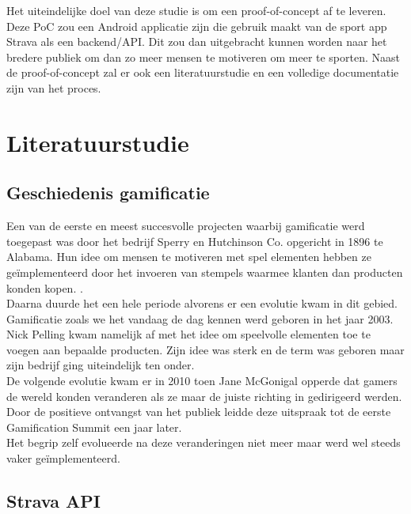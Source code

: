 Het uiteindelijke doel van deze studie is om een proof-of-concept af te leveren. Deze PoC zou een Android applicatie zijn die gebruik maakt van de sport app Strava als een backend/API. Dit zou dan uitgebracht kunnen worden naar het bredere publiek om dan zo meer mensen te motiveren om meer te sporten. Naast de proof-of-concept zal er ook een literatuurstudie en een volledige documentatie zijn van het proces.


\section{Literatuurstudie}%
\label{sec:state-of-the-art}

\subsection{Geschiedenis gamificatie}

Een van de eerste en meest succesvolle projecten waarbij gamificatie werd toegepast was door het bedrijf Sperry en Hutchinson Co. opgericht in 1896 te Alabama. Hun idee om mensen te motiveren met spel elementen hebben ze geïmplementeerd door het invoeren van stempels waarmee klanten dan producten konden kopen. \autocite{Christians2018}. \\

Daarna duurde het een hele periode alvorens er een evolutie kwam in dit gebied. Gamificatie zoals we het vandaag de dag kennen werd geboren in het jaar 2003. Nick Pelling kwam namelijk af met het idee om speelvolle elementen toe te voegen aan bepaalde producten. Zijn idee was sterk en de term was geboren maar zijn bedrijf ging uiteindelijk ten onder. \autocite{Khaitova2021} \\

De volgende evolutie kwam er in 2010 toen Jane McGonigal opperde dat gamers de wereld konden veranderen als ze maar de juiste richting in gedirigeerd werden. Door de positieve ontvangst van het publiek leidde deze uitspraak tot de eerste Gamification Summit een jaar later. \autocite{Christians2018} \\

Het begrip zelf evolueerde na deze veranderingen niet meer maar werd wel steeds vaker geïmplementeerd. 

\subsection{Strava API}

